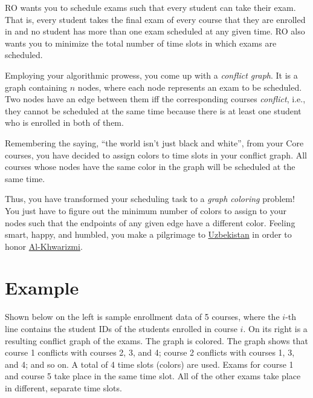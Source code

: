 \documentclass[a4paper]{exam}
\begin{document}
RO wants you to schedule exams such that every student can take their exam. That is, every student takes the final exam of every course that they are enrolled in and no student has more than one exam scheduled at any given time. RO also wants you to minimize the total number of time slots in which exams are scheduled.

Employing your algorithmic prowess, you come up with a \textit{conflict graph}. It is a graph containing $n$ nodes, where each node represents an exam to be scheduled. Two nodes have an edge between them iff the corresponding courses \textit{conflict}, i.e., they cannot be scheduled at the same time because there is at least one student who is enrolled in both of them.

Remembering the saying, ``the world isn't just black and white'', from your Core courses, you have decided to assign colors to time slots in your conflict graph. All courses whose nodes have the same color in the graph will be scheduled at the same time.

Thus, you have transformed your scheduling task to a \textit{graph coloring} problem! You just have to figure out the minimum number of colors to assign to your nodes such that the endpoints of any given edge have a different color. Feeling smart, happy, and humbled, you make a pilgrimage to \href{https://en.wikipedia.org/wiki/Al-Khwarizmi_Complex}{Uzbekistan} in order to honor \href{https://www.openculture.com/2022/04/why-algorithms-are-called-algorithms.html}{Al-Khwarizmi}.


\section*{Example}

Shown below on the left is sample enrollment data of 5 courses, where the $i$-th line contains the student IDs of the students enrolled in course $i$. On its right is a resulting conflict graph of the exams. The graph is colored. The graph shows that course 1 conflicts with courses 2, 3, and 4; course 2 conflicts with courses 1, 3, and 4; and so on. A total of 4 time slots (colors) are used. Exams for course 1 and course 5 take place in the same time slot. All of the other exams take place in different, separate time slots.
\bigskip
\end{document}
